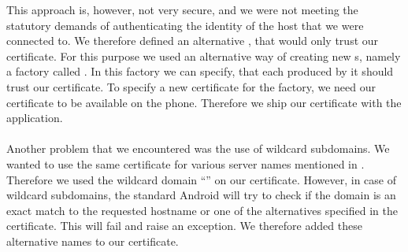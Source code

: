 This approach is, however, not very secure, and we were not meeting the statutory demands of authenticating the identity of the host that we were connected to. We therefore defined an alternative , that would only trust our certificate. For this purpose we used an alternative way of creating new s, namely a factory called . In this factory we can specify, that each  produced by it should trust our certificate. To specify a new certificate for the factory, we need our certificate to be available on the phone. Therefore we ship our certificate with the application. 
\\\\
Another problem that we encountered was the use of wildcard subdomains. We wanted to use the same certificate for various server names mentioned in . Therefore we used the wildcard domain ``'' on our certificate. However, in case of wildcard subdomains, the standard Android  will try to check if the domain is an exact match to the requested hostname or one of the alternatives specified in the certificate. This will fail and raise an exception. We therefore added these alternative names to our certificate.